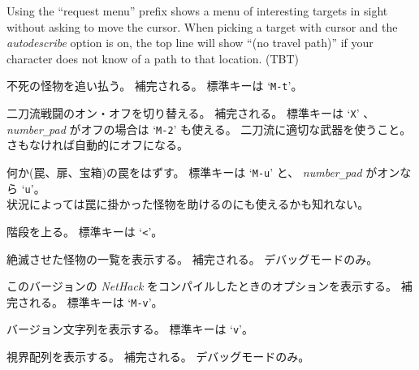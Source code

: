 Using the ``request menu'' prefix shows a menu of interesting targets in sight
without asking to move the cursor.
When picking a target with cursor and the {\it autodescribe\/}
option is on, the top line will show ``(no travel path)'' if
your character does not know of a path to that location.
(TBT)
\item[\tb{\#turn}]
不死の怪物を追い払う。
補完される。
標準キーは `{\tt M-t}'。
\item[\tb{\#twoweapon}]
二刀流戦闘のオン・オフを切り替える。
補完される。
標準キーは `{\tt X}' 、{\it number\verb+_+pad\/} がオフの場合は
`{\tt M-2}' も使える。
二刀流に適切な武器を使うこと。
さもなければ自動的にオフになる。
\item[\tb{\#untrap}]
何か(罠、扉、宝箱)の罠をはずす。
標準キーは `{\tt M-u}' と、
{\it number\verb+_+pad\/} がオンなら `{\tt u}'。\\
状況によっては罠に掛かった怪物を助けるのにも使えるかも知れない。
\item[\tb{\#up}]
階段を上る。
標準キーは `{\tt <}'。
\item[\tb{\#vanquished}]
絶滅させた怪物の一覧を表示する。
補完される。
デバッグモードのみ。
\item[\tb{\#version}]
このバージョンの {\it NetHack\/} をコンパイルしたときのオプションを表示する。
補完される。
標準キーは `{\tt M-v}'。
\item[\tb{\#versionshort}]
バージョン文字列を表示する。
標準キーは `{\tt v}'。
\item[\tb{\#vision}]
視界配列を表示する。
補完される。
デバッグモードのみ。
\item[\tb{\#wait}]
